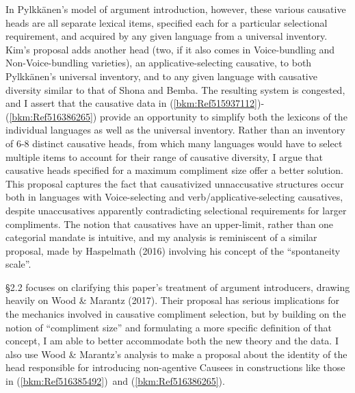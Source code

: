 \documentclass[12pt]{article}
\newenvironment{styleStandard}{\setlength\leftskip{0cm}\setlength\rightskip{0cm plus 1fil}\setlength\parindent{0cm}\setlength\parfillskip{0pt plus 1fil}\setlength\parskip{0in plus 1pt}\writerlistparindent\writerlistleftskip\leavevmode\normalfont\normalsize\writerlistlabel\ignorespaces}{\unskip\vspace{0.111in plus 0.0111in}\par}
\newenvironment{styleDefault}{\renewcommand\baselinestretch{1.0}\setlength\leftskip{0cm}\setlength\rightskip{0cm plus 1fil}\setlength\parindent{0cm}\setlength\parfillskip{0pt plus 1fil}\setlength\parskip{0in plus 1pt}\writerlistparindent\writerlistleftskip\leavevmode\normalfont\normalsize\writerlistlabel\ignorespaces}{\unskip\vspace{0in plus 1pt}\par}
\newcommand\writerlistleftskip{}
\newcommand\writerlistparindent{}
\newcommand\writerlistlabel{}
\begin{document}
\begin{styleDefault}
In Pylkkänen’s model of argument introduction, however, these various causative heads are all separate lexical items, specified each for a particular selectional requirement, and acquired by any given language from a universal inventory. Kim’s proposal adds another head (two, if it also comes in Voice-bundling and Non-Voice-bundling varieties), an applicative-selecting causative, to both Pylkkänen’s universal inventory, and to any given language with causative diversity similar to that of Shona and Bemba. The resulting system is congested, and I assert that the causative data in (\ref{bkm:Ref515937112}){}-(\ref{bkm:Ref516386265}) provide an opportunity to simplify both the lexicons of the individual languages as well as the universal inventory. \newline
\newline
Rather than an inventory of 6-8 distinct causative heads, from which many languages would have to select multiple items to account for their range of causative diversity, I argue that causative heads specified for a maximum compliment size offer a better solution. This proposal captures the fact that causativized unnaccusative structures occur both in languages with Voice-selecting and verb/applicative-selecting causatives, despite unaccusatives apparently contradicting selectional requirements for larger compliments. The notion that causatives have an upper-limit, rather than one categorial mandate is intuitive, and my analysis is reminiscent of a similar proposal, made by Haspelmath (2016) involving his concept of the “spontaneity scale”. \newline

\end{styleDefault}

\begin{styleStandard}
§2.2 focuses on clarifying this paper’s treatment of argument introducers, drawing heavily on Wood \& Marantz (2017). Their proposal has serious implications for the mechanics involved in causative compliment selection, but by building on the notion of “compliment size” and formulating a more specific definition of that concept, I am able to better accommodate both the new theory and the data. I also use Wood \& Marantz’s analysis to make a proposal about the identity of the head responsible for introducing non-agentive Causees in constructions like those in (\ref{bkm:Ref516385492})\ and (\ref{bkm:Ref516386265}).
\end{styleStandard}
\end{document}
